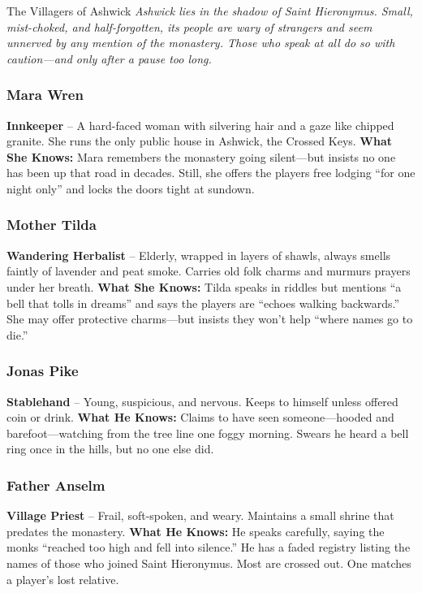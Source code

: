 \documentclass[nodeprecatedcode,bg=print]{dndbook/dndbook}
\begin{document}
\begin{WyrdFullNPC}[%
    name=The Villagers of Ashwick,%
    description=The last voices before the silence,%
    float=!t%
]{The Villagers of Ashwick}
    \emph{Ashwick lies in the shadow of Saint Hieronymus. Small, mist-choked, and half-forgotten, its people are wary of strangers and seem unnerved by any mention of the monastery. Those who speak at all do so with caution—and only after a pause too long.}

    \subsubsection*{Mara Wren}
    \textbf{Innkeeper} – A hard-faced woman with silvering hair and a gaze like chipped granite. She runs the only public house in Ashwick, the Crossed Keys.
    \textbf{What She Knows:} Mara remembers the monastery going silent—but insists no one has been up that road in decades. Still, she offers the players free lodging “for one night only” and locks the doors tight at sundown.

    \subsubsection*{Mother Tilda}
    \textbf{Wandering Herbalist} – Elderly, wrapped in layers of shawls, always smells faintly of lavender and peat smoke. Carries old folk charms and murmurs prayers under her breath.
    \textbf{What She Knows:} Tilda speaks in riddles but mentions “a bell that tolls in dreams” and says the players are “echoes walking backwards.” She may offer protective charms—but insists they won’t help “where names go to die.”

    \subsubsection*{Jonas Pike}
    \textbf{Stablehand} – Young, suspicious, and nervous. Keeps to himself unless offered coin or drink.
    \textbf{What He Knows:} Claims to have seen someone—hooded and barefoot—watching from the tree line one foggy morning. Swears he heard a bell ring once in the hills, but no one else did.

    \subsubsection*{Father Anselm}
    \textbf{Village Priest} – Frail, soft-spoken, and weary. Maintains a small shrine that predates the monastery.
    \textbf{What He Knows:} He speaks carefully, saying the monks “reached too high and fell into silence.” He has a faded registry listing the names of those who joined Saint Hieronymus. Most are crossed out. One matches a player’s lost relative.
\end{WyrdFullNPC}
\end{document}
